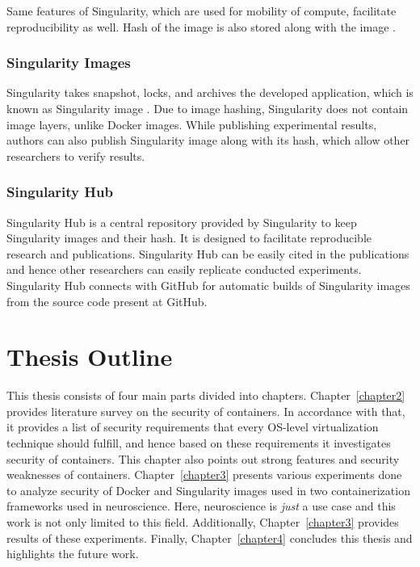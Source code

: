 Same features of Singularity, which are used for mobility of compute,
facilitate reproducibility as well. Hash of the image is also stored
along with the image \cite{kurtzer2017singularity}.


\subsubsection{Singularity Images}

Singularity takes snapshot, locks, and archives the developed application,
which is known as Singularity image \cite{kurtzer2016singularity}.
Due to image hashing, Singularity does not contain image layers, unlike
Docker images. While publishing experimental results, authors can also
publish Singularity image along with its hash, which allow other
researchers to verify results.


\subsubsection{Singularity Hub}

Singularity Hub is a central repository provided by Singularity to keep
Singularity images and their hash. It is designed to facilitate
reproducible research and publications. Singularity Hub can be easily
cited in the publications and hence other researchers can easily
replicate conducted experiments. Singularity Hub connects with
GitHub for automatic builds of Singularity images from the source
code present at GitHub.

\section{Thesis Outline}
This thesis consists of four main parts divided into chapters.
Chapter~\ref{chapter2} provides literature survey on the security of containers. 
In accordance with that, it provides a list of security requirements that 
every OS-level virtualization technique should fulfill, and hence based on 
these requirements it investigates security of containers. This chapter 
also points out strong features and security weaknesses of containers.
Chapter~\ref{chapter3} presents various experiments done to analyze security 
of Docker and Singularity images used in two containerization frameworks 
used in neuroscience. Here, neuroscience is \textit{just}
a use case and this work is not only limited to this field.
Additionally, Chapter~\ref{chapter3} 
provides results of these experiments.
Finally, Chapter~\ref{chapter4} concludes this thesis and highlights the future work.
